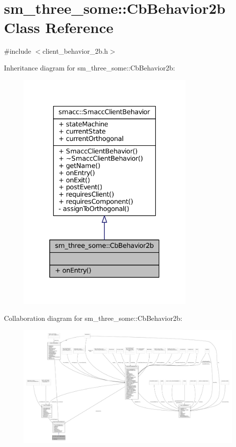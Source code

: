 \hypertarget{classsm__three__some_1_1CbBehavior2b}{}\section{sm\+\_\+three\+\_\+some\+:\+:Cb\+Behavior2b Class Reference}
\label{classsm__three__some_1_1CbBehavior2b}


{\ttfamily \#include $<$client\+\_\+behavior\+\_\+2b.\+h$>$}



Inheritance diagram for sm\+\_\+three\+\_\+some\+:\+:Cb\+Behavior2b\+:
\nopagebreak
\begin{figure}[H]
\begin{center}
\leavevmode
\includegraphics[width=247pt]{classsm__three__some_1_1CbBehavior2b__inherit__graph}
\end{center}
\end{figure}


Collaboration diagram for sm\+\_\+three\+\_\+some\+:\+:Cb\+Behavior2b\+:
\nopagebreak
\begin{figure}[H]
\begin{center}
\leavevmode
\includegraphics[width=350pt]{classsm__three__some_1_1CbBehavior2b__coll__graph}
\end{center}
\end{figure}
